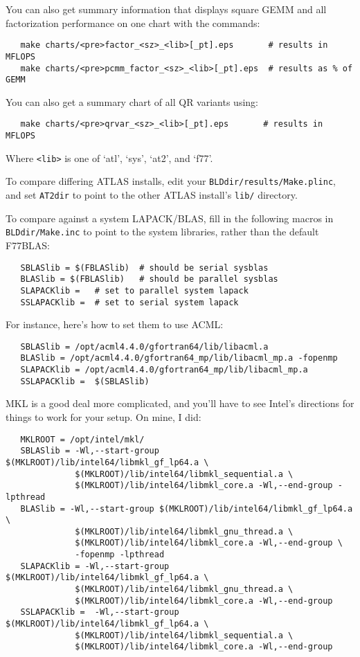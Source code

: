 \documentclass[11pt]{article}
\begin{document}
You can also get summary information that displays square GEMM and all
factorization performance on one chart with the commands:
\begin{verbatim}
   make charts/<pre>factor_<sz>_<lib>[_pt].eps       # results in MFLOPS
   make charts/<pre>pcmm_factor_<sz>_<lib>[_pt].eps  # results as % of GEMM
\end{verbatim}
You can also get a summary chart of all QR variants using:
\begin{verbatim}
   make charts/<pre>qrvar_<sz>_<lib>[_pt].eps       # results in MFLOPS
\end{verbatim}
Where \verb+<lib>+ is one of `atl', `sys', `at2', and `f77'.

To compare differing ATLAS installs, edit your {\tt BLDdir/results/Make.plinc},
and set {\tt AT2dir} to point to the other ATLAS install's {\tt lib/} directory.

{\samepage
To compare against a system LAPACK/BLAS, fill in the following macros in 
{\tt BLDdir/Make.inc} to point to the system libraries, rather than
the default F77BLAS:
\begin{verbatim}
   SBLASlib = $(FBLASlib)  # should be serial sysblas
   BLASlib = $(FBLASlib)   # should be parallel sysblas
   SLAPACKlib =   # set to parallel system lapack
   SSLAPACKlib =  # set to serial system lapack
\end{verbatim}
}

{\samepage
For instance, here's how to set them to use ACML:
\begin{verbatim}
   SBLASlib = /opt/acml4.4.0/gfortran64/lib/libacml.a
   BLASlib = /opt/acml4.4.0/gfortran64_mp/lib/libacml_mp.a -fopenmp
   SLAPACKlib = /opt/acml4.4.0/gfortran64_mp/lib/libacml_mp.a
   SSLAPACKlib =  $(SBLASlib)
\end{verbatim}
}

{\samepage
MKL is a good deal more complicated, and you'll have to see Intel's
directions for things to work for your setup.  On mine, I did:
\begin{verbatim}
   MKLROOT = /opt/intel/mkl/
   SBLASlib = -Wl,--start-group $(MKLROOT)/lib/intel64/libmkl_gf_lp64.a \
              $(MKLROOT)/lib/intel64/libmkl_sequential.a \
              $(MKLROOT)/lib/intel64/libmkl_core.a -Wl,--end-group -lpthread
   BLASlib = -Wl,--start-group $(MKLROOT)/lib/intel64/libmkl_gf_lp64.a \
              $(MKLROOT)/lib/intel64/libmkl_gnu_thread.a \
              $(MKLROOT)/lib/intel64/libmkl_core.a -Wl,--end-group \
              -fopenmp -lpthread
   SLAPACKlib = -Wl,--start-group $(MKLROOT)/lib/intel64/libmkl_gf_lp64.a \
              $(MKLROOT)/lib/intel64/libmkl_gnu_thread.a \
              $(MKLROOT)/lib/intel64/libmkl_core.a -Wl,--end-group
   SSLAPACKlib =  -Wl,--start-group $(MKLROOT)/lib/intel64/libmkl_gf_lp64.a \
              $(MKLROOT)/lib/intel64/libmkl_sequential.a \
              $(MKLROOT)/lib/intel64/libmkl_core.a -Wl,--end-group
\end{verbatim}
}
\end{document}
